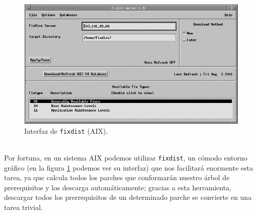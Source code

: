 \begin{figure}
\begin{center}
\includegraphics[width=\textwidth]{fixdist.png}
\end{center}
\caption{Interfaz de {\tt fixdist} (AIX).}
\label{fixdist}
\end{figure}
\\Por fortuna, en un sistema AIX podemos utilizar {\tt fixdist}, un c\'omodo
entorno gr\'afico (en la figura \ref{fixdist} podemos ver su interfaz) que
nos facilitar\'a enormente esta tarea, ya que calcula todos los parches que
conformar\'an nuestro \'arbol de prerequisitos y los descarga autom\'aticamente;
gracias a esta herramienta, descargar todos los prerrequisitos de un
determinado parche se convierte en una tarea trivial.
